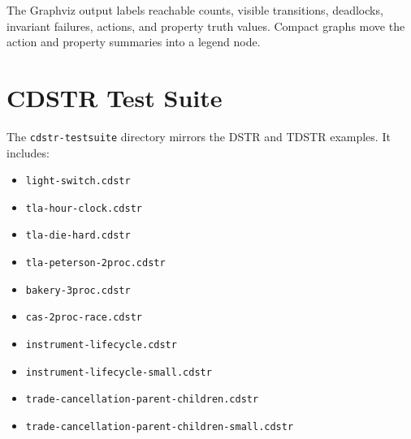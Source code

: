 \documentclass[11pt]{article}
\begin{document}
\begin{center}
\end{center}

The Graphviz output labels reachable counts, visible transitions, deadlocks,
invariant failures, actions, and property truth values.  Compact graphs move
the action and property summaries into a legend node.

\section{CDSTR Test Suite}

The \texttt{cdstr-testsuite} directory mirrors the DSTR and TDSTR examples.
It includes:

\begin{itemize}
\item \texttt{light-switch.cdstr}
\item \texttt{tla-hour-clock.cdstr}
\item \texttt{tla-die-hard.cdstr}
\item \texttt{tla-peterson-2proc.cdstr}
\item \texttt{bakery-3proc.cdstr}
\item \texttt{cas-2proc-race.cdstr}
\item \texttt{instrument-lifecycle.cdstr}
\item \texttt{instrument-lifecycle-small.cdstr}
\item \texttt{trade-cancellation-parent-children.cdstr}
\item \texttt{trade-cancellation-parent-children-small.cdstr}
\end{itemize}
\end{document}
